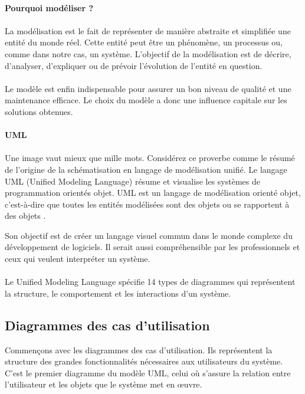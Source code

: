 
\paragraph{Pourquoi modéliser ?}
\paragraph{}
La modélisation est le fait de représenter de manière abstraite et simplifiée
une entité du monde réel. Cette entité peut être un phénomène, un processus ou, 
comme dans notre cas, un système. L'objectif de la modélisation est de décrire,
d'analyser, d'expliquer ou de prévoir l'évolution de l'entité en question.
\paragraph{}
Le modèle est enfin indispensable pour assurer un bon niveau de qualité 
et une maintenance efficace. Le choix du modèle a donc une influence capitale 
sur les solutions obtenues.
\paragraph{UML}
\paragraph{}
Une image vaut mieux que mille mots.
Considérez ce proverbe comme le résumé de l'origine
de la schématisation en langage de modélisation unifié.
Le langage UML (Unified Modeling Language) résume et visualise les 
systèmes de programmation orientés objet. UML est un langage de 
modélisation orienté objet, c’est-à-dire que toutes 
les entités modélisées sont des objets ou se rapportent à des 
objets \cite{conan}.

Son objectif est de créer un langage visuel commun dans le monde 
complexe du développement de logiciels. Il serait aussi compréhensible
par les professionnels et ceux qui veulent interpréter un système. 
\paragraph{}
Le Unified Modeling Language spécifie 14 types de 
diagrammes qui représentent la structure, le comportement et les interactions d’un système.
\subsection{Diagrammes des cas d'utilisation}
Commençons avec les diagrammes des cas d'utilisation. Ils représentent 
la structure des grandes fonctionnalités nécessaires 
aux utilisateurs du système. C'est le premier diagramme du modèle UML, celui où s'assure la 
relation entre l'utilisateur et les objets que le système met en œuvre\cite{audibert2009uml}.
